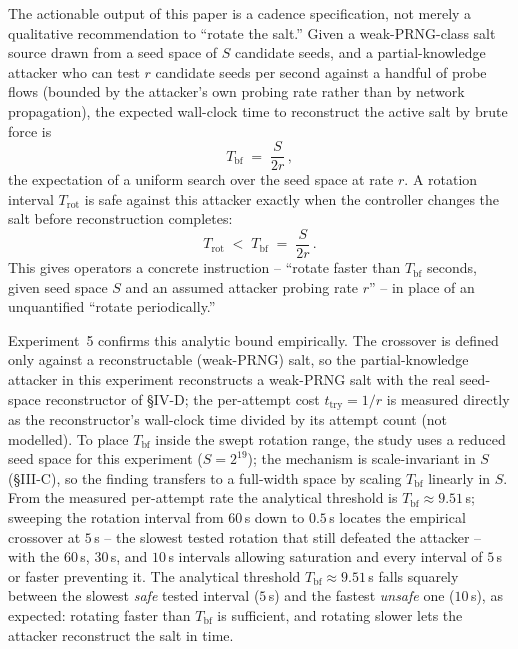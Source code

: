 \documentclass[conference]{IEEEtran}
\begin{document}
The actionable output of this paper is a cadence specification, not merely a qualitative recommendation to
``rotate the salt.'' Given a weak-PRNG-class salt source drawn from a seed space of $S$ candidate seeds, and a
partial-knowledge attacker who can test $r$ candidate seeds per second against a handful of probe flows (bounded
by the attacker's own probing rate rather than by network propagation), the expected wall-clock time to
reconstruct the active salt by brute force is
\begin{equation}
T_{\mathrm{bf}} \;=\; \frac{S}{2r}\,,
\end{equation}
the expectation of a uniform search over the seed space at rate $r$. A rotation interval $T_{\mathrm{rot}}$ is
safe against this attacker exactly when the controller changes the salt before reconstruction completes:
\begin{equation}
T_{\mathrm{rot}} \;<\; T_{\mathrm{bf}} \;=\; \frac{S}{2r}\,.
\end{equation}
This gives operators a concrete instruction -- ``rotate faster than $T_{\mathrm{bf}}$ seconds, given seed space
$S$ and an assumed attacker probing rate $r$'' -- in place of an unquantified ``rotate periodically.''

Experiment~5 confirms this analytic bound empirically. The crossover is defined only against a reconstructable
(weak-PRNG) salt, so the partial-knowledge attacker in this experiment reconstructs a weak-PRNG salt with the
real seed-space reconstructor of \S IV-D; the per-attempt cost $t_{\mathrm{try}} = 1/r$ is measured directly as
the reconstructor's wall-clock time divided by its attempt count (not modelled). To place $T_{\mathrm{bf}}$
inside the swept rotation range, the study uses a reduced seed space for this experiment ($S = 2^{19}$); the
mechanism is scale-invariant in $S$ (\S III-C), so the finding transfers to a full-width space by scaling
$T_{\mathrm{bf}}$ linearly in $S$. From the measured per-attempt rate the analytical threshold is
$T_{\mathrm{bf}} \approx 9.51$\,s; sweeping the rotation interval from $60$\,s down to $0.5$\,s locates the
empirical crossover at $5$\,s -- the slowest tested rotation that still defeated the attacker -- with the
$60$\,s, $30$\,s, and $10$\,s intervals allowing saturation and every interval of $5$\,s or faster preventing
it. The analytical threshold $T_{\mathrm{bf}} \approx 9.51$\,s falls squarely between the slowest \emph{safe}
tested interval ($5$\,s) and the fastest \emph{unsafe} one ($10$\,s), as expected: rotating faster than
$T_{\mathrm{bf}}$ is sufficient, and rotating slower lets the attacker reconstruct the salt in time.
\end{document}
